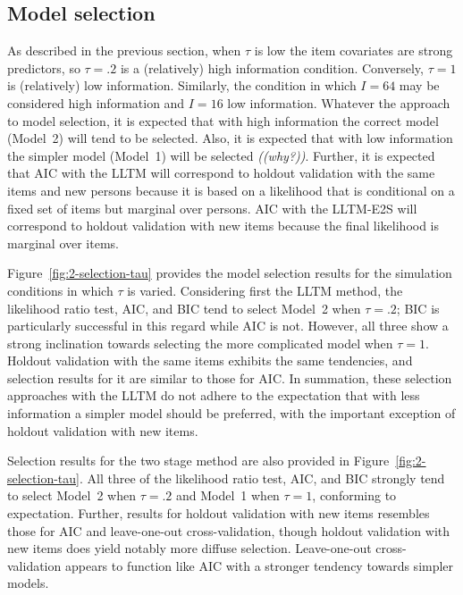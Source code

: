 \subsection{Model selection}

As described in the previous section, when $\tau$ is low the item covariates are strong predictors, so $\tau = .2$ is a (relatively) high information condition. Conversely, $\tau = 1$ is (relatively) low information. Similarly, the condition in which $I=64$ may be considered high information and $I=16$ low information. Whatever the approach to model selection, it is expected that with high information the correct model (Model~2) will tend to be selected. Also, it is expected that with low information the simpler model (Model~1) will be selected \emph{((why?))}. 
Further, it is expected that AIC with the LLTM will correspond to holdout validation with the same items and new persons because it is based on a likelihood that is conditional on a fixed set of items but marginal over persons.
AIC with the LLTM-E2S will correspond to holdout validation with new items because the final likelihood is marginal over items.

Figure~\ref{fig:2-selection-tau} provides the model selection results for the simulation conditions in which $\tau$ is varied. Considering first the LLTM method, the likelihood ratio test, AIC, and BIC tend to select Model~2 when $\tau = .2$; BIC is particularly successful in this regard while AIC is not. However, all three show a strong inclination towards selecting the more complicated model when $\tau = 1$. Holdout validation with the same items exhibits the same tendencies, and selection results for it are similar to those for AIC. In summation, these selection approaches with the LLTM do not adhere to the expectation that with less information a simpler model should be preferred, with the important exception of holdout validation with new items.

Selection results for the two stage method are also provided in Figure~\ref{fig:2-selection-tau}. All three of the likelihood ratio test, AIC, and BIC strongly tend to select Model~2 when $\tau = .2$ and Model~1 when $\tau = 1$, conforming to expectation. Further, results for holdout validation with new items resembles those for AIC and leave-one-out cross-validation, though holdout validation with new items does yield notably more diffuse selection. Leave-one-out cross-validation appears to function like AIC with a stronger tendency towards simpler models.

